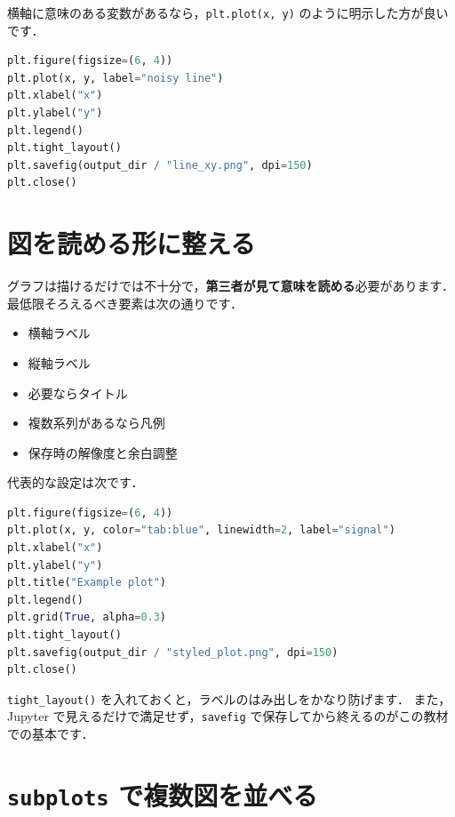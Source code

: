 
横軸に意味のある変数があるなら，\texttt{plt.plot(x, y)} のように明示した方が良いです．

\begin{lstlisting}[style=codecell,language=Python]
plt.figure(figsize=(6, 4))
plt.plot(x, y, label="noisy line")
plt.xlabel("x")
plt.ylabel("y")
plt.legend()
plt.tight_layout()
plt.savefig(output_dir / "line_xy.png", dpi=150)
plt.close()
\end{lstlisting}



\section{図を読める形に整える}

グラフは描けるだけでは不十分で，\textbf{第三者が見て意味を読める}必要があります．
最低限そろえるべき要素は次の通りです．
\begin{itemize}
\item 横軸ラベル
\item 縦軸ラベル
\item 必要ならタイトル
\item 複数系列があるなら凡例
\item 保存時の解像度と余白調整
\end{itemize}

代表的な設定は次です．

\begin{lstlisting}[style=codecell,language=Python]
plt.figure(figsize=(6, 4))
plt.plot(x, y, color="tab:blue", linewidth=2, label="signal")
plt.xlabel("x")
plt.ylabel("y")
plt.title("Example plot")
plt.legend()
plt.grid(True, alpha=0.3)
plt.tight_layout()
plt.savefig(output_dir / "styled_plot.png", dpi=150)
plt.close()
\end{lstlisting}

\texttt{tight\_layout()} を入れておくと，ラベルのはみ出しをかなり防げます．
また，Jupyter で見えるだけで満足せず，\texttt{savefig} で保存してから終えるのがこの教材での基本です．


\section{\texttt{subplots} で複数図を並べる}

